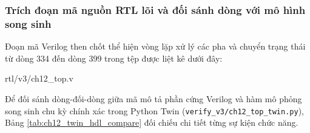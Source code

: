 \subsubsection*{Trích đoạn mã nguồn RTL lõi và đối sánh dòng với mô hình song sinh}
Đoạn mã Verilog then chốt thể hiện vòng lặp xử lý các pha và chuyển trạng thái từ dòng 334 đến dòng 399 trong tệp  được liệt kê dưới đây:


{rtl/v3/ch12_top.v}

Để đối sánh dòng-đối-dòng giữa mã mô tả phần cứng Verilog và hàm mô phỏng song sinh chu kỳ chính xác trong Python Twin (\texttt{verify\_v3/ch12\_top\_twin.py}), Bảng \ref{tab:ch12_twin_hdl_compare} đối chiếu chi tiết từng sự kiện chức năng.

